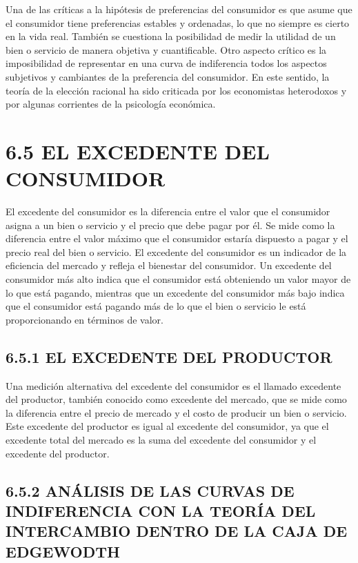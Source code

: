 \documentclass[
  spanish,
  12pt,
]{book}
\begin{document}
Una de las críticas a la hipótesis de preferencias del consumidor es que
asume que el consumidor tiene preferencias estables y ordenadas, lo que
no siempre es cierto en la vida real. También se cuestiona la
posibilidad de medir la utilidad de un bien o servicio de manera
objetiva y cuantificable. Otro aspecto crítico es la imposibilidad de
representar en una curva de indiferencia todos los aspectos subjetivos y
cambiantes de la preferencia del consumidor. En este sentido, la teoría
de la elección racional ha sido criticada por los economistas
heterodoxos y por algunas corrientes de la psicología económica.

\section{6.5 EL EXCEDENTE DEL
CONSUMIDOR}\label{el-excedente-del-consumidor}

El excedente del consumidor es la diferencia entre el valor que el
consumidor asigna a un bien o servicio y el precio que debe pagar por
él. Se mide como la diferencia entre el valor máximo que el consumidor
estaría dispuesto a pagar y el precio real del bien o servicio. El
excedente del consumidor es un indicador de la eficiencia del mercado y
refleja el bienestar del consumidor. Un excedente del consumidor más
alto indica que el consumidor está obteniendo un valor mayor de lo que
está pagando, mientras que un excedente del consumidor más bajo indica
que el consumidor está pagando más de lo que el bien o servicio le está
proporcionando en términos de valor.

\subsection{6.5.1 EL EXCEDENTE DEL
PRODUCTOR}\label{el-excedente-del-productor}

Una medición alternativa del excedente del consumidor es el llamado
excedente del productor, también conocido como excedente del mercado,
que se mide como la diferencia entre el precio de mercado y el costo de
producir un bien o servicio. Este excedente del productor es igual al
excedente del consumidor, ya que el excedente total del mercado es la
suma del excedente del consumidor y el excedente del productor.

\subsection{6.5.2 ANÁLISIS DE LAS CURVAS DE INDIFERENCIA CON LA TEORÍA
DEL INTERCAMBIO DENTRO DE LA CAJA DE
EDGEWODTH}\label{anuxe1lisis-de-las-curvas-de-indiferencia-con-la-teoruxeda-del-intercambio-dentro-de-la-caja-de-edgewodth}
\end{document}
